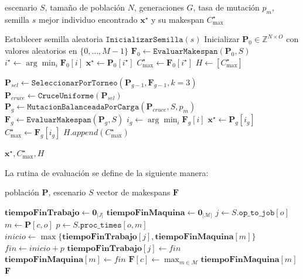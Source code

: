 \documentclass[11pt,a4paper]{article}
\begin{document}
\begin{algorithm}[H]
\caption{Algoritmo genético implementado para la planificación de tareas}
\begin{algorithmic}[1]
\Require escenario $S$, tamaño de población $N$, generaciones $G$, tasa de mutación $p_m$, semilla $s$
\Ensure mejor individuo encontrado $\mathbf{x}^{\star}$ y su makespan $C_{\max}^{\star}$

\State Establecer semilla aleatoria $\texttt{InicializarSemilla}(s)$
\State Inicializar $\mathbf{P}_0 \in \mathbb{Z}^{N \times O}$ con valores aleatorios en $\{0,\dots,M-1\}$
\State $\mathbf{F}_0 \leftarrow \texttt{EvaluarMakespan}(\mathbf{P}_0, S)$
\State $i^{\star} \leftarrow \arg\min_{i} \mathbf{F}_0[i]$
\State $\mathbf{x}^{\star} \leftarrow \mathbf{P}_0[i^{\star}]$
\State $C_{\max}^{\star} \leftarrow \mathbf{F}_0[i^{\star}]$
\State $H \leftarrow [C_{\max}^{\star}]$

    \State $\mathbf{P}_{sel} \leftarrow \texttt{SeleccionarPorTorneo}(\mathbf{P}_{g-1}, \mathbf{F}_{g-1}, k=3)$
    \State $\mathbf{P}_{cruce} \leftarrow \texttt{CruceUniforme}(\mathbf{P}_{sel})$
    \State $\mathbf{P}_{g} \leftarrow \texttt{MutacionBalanceadaPorCarga}(\mathbf{P}_{cruce}, S, p_m)$
    \State $\mathbf{F}_g \leftarrow \texttt{EvaluarMakespan}(\mathbf{P}_{g}, S)$
    \State $i_g \leftarrow \arg\min_{i} \mathbf{F}_g[i]$
        \State $\mathbf{x}^{\star} \leftarrow \mathbf{P}_g[i_g]$
        \State $C_{\max}^{\star} \leftarrow \mathbf{F}_g[i_g]$
    \EndIf
    \State $H.append(C_{\max}^{\star})$
\EndFor

\State \Return $\mathbf{x}^{\star}, C_{\max}^{\star}, H$
\end{algorithmic}
\end{algorithm}

La rutina de evaluación se define de la siguiente manera:

\begin{algorithm}[H]
\caption{EvaluarMakespan}
\begin{algorithmic}[1]
\Require población $\mathbf{P}$, escenario $S$
\Ensure vector de makespans $\mathbf{F}$

    \State $\mathbf{tiempoFinTrabajo} \leftarrow \mathbf{0}_{|J|}$
    \State $\mathbf{tiempoFinMaquina} \leftarrow \mathbf{0}_{|\mathcal{M}|}$
            \State $j \leftarrow S.\texttt{op\_to\_job}[o]$
            \State $m \leftarrow \mathbf{P}[c,o]$
            \State $p \leftarrow S.\texttt{proc\_times}[o,m]$
            \State $inicio \leftarrow \max\{\mathbf{tiempoFinTrabajo}[j], \mathbf{tiempoFinMaquina}[m]\}$
            \State $fin \leftarrow inicio + p$
            \State $\mathbf{tiempoFinTrabajo}[j] \leftarrow fin$
            \State $\mathbf{tiempoFinMaquina}[m] \leftarrow fin$
        \EndFor
    \EndFor
    \State $\mathbf{F}[c] \leftarrow \max_{m \in \mathcal{M}} \mathbf{tiempoFinMaquina}[m]$
\EndFor
\State \Return $\mathbf{F}$
\end{algorithmic}
\end{algorithm}
\end{document}
